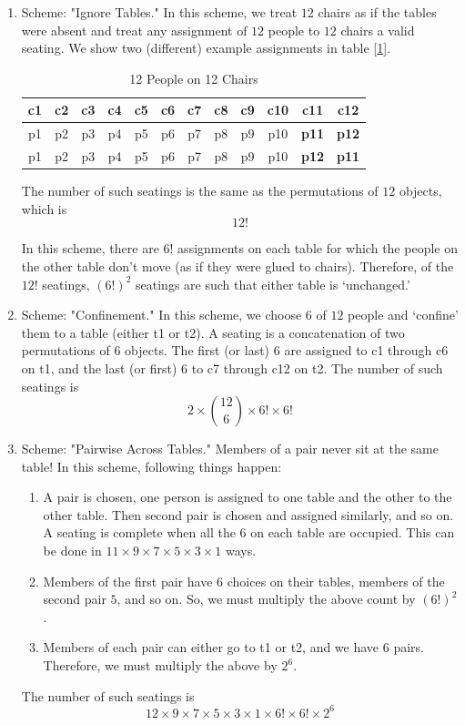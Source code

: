 \documentclass[11pt]{book}
\theoremstyle{definition}
\theoremstyle{plain}
\theoremstyle{definition}
\theoremstyle{problemstyle}
\theoremstyle{remark}
\theoremstyle{definition}
\begin{document}
\begin{enumerate}[label=\arabic*)]
    \item Scheme: "Ignore Tables." In this scheme, we treat $12$ chairs as if the tables were absent and treat any assignment of $12$ people to $12$ chairs a valid seating. We show two (different) example assignments in table [\ref{tab:12c12p}].
\begin{table}[H] 
\centering
\begin{tabular}{|c|c|c|c|c|c|c|c|c|c|c|c|}
 \hline
    c1&c2&c3&c4&c5&c6&c7&c8&c9&c10&c11&c12\\ \hline
    \hline
    p1&p2&p3&p4&p5&p6&p7&p8&p9&p10&\textbf{p11}&\textbf{p12}\\\hline
    p1&p2&p3&p4&p5&p6&p7&p8&p9&p10&\textbf{p12}&\textbf{p11}\\\hline
\end{tabular}
    \caption{12 People on 12 Chairs}
    \label{tab:12c12p}
\end{table}
The number of such seatings is the same as the permutations of $12$ objects, which is 
        \[
            12!
        \]

        In this scheme, there are $6!$ assignments on each table for which the people on the other table don't move (as if they were glued to chairs). Therefore, of the $12!$ seatings, $(6!)^2$ seatings are such that either table is `unchanged.'

    \item Scheme: "Confinement." In this scheme, we choose $6$ of $12$ people and `confine' them to a table (either t1 or t2). A seating is a concatenation of two permutations of $6$ objects. The first (or last) $6$ are assigned to c1 through c6 on t1, and the last (or first) $6$ to c7 through c12 on t2.
        The number of such seatings is
        \[
            2\times\binom{12}{6}\times6!\times6!
        \]

    \item Scheme: "Pairwise Across Tables." Members of a pair never sit at the same table! In this scheme, following things happen:
        \begin{enumerate}[label=\alph*)]
            \item A pair is chosen, one person is assigned to one table and the other to the other table. Then second pair is chosen and assigned similarly, and so on. A seating is complete when all the 6 on each table are occupied. This can be done in $11\times9\times7\times5\times3\times1$ ways.        
            \item Members of the first pair have $6$ choices on their tables, members of the second pair $5$, and so on. So, we must multiply the above count by $(6!)^2$.
            \item Members of each pair can either go to t1 or t2, and we have $6$ pairs. Therefore, we must multiply the above by $2^6$.
        \end{enumerate}
        The number of such seatings is 
        \[
            12\times9\times7\times5\times3\times1\times6!\times6!\times2^6
        \]

\end{enumerate}
\end{document}
